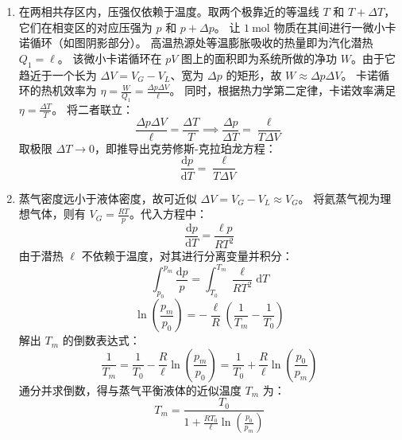 \begin{solution}
\begin{enumerate}
    \item[(a)] 在两相共存区内，压强仅依赖于温度。取两个极靠近的等温线 $T$ 和 $T + \Delta T$，它们在相变区的对应压强为 $p$ 和 $p + \Delta p$。
    让 $1 \ \mathrm{mol}$ 物质在其间进行一微小卡诺循环（如图阴影部分）。
    高温热源处等温膨胀吸收的热量即为汽化潜热 $Q_1 = \ell$。
    该微小卡诺循环在 $pV$ 图上的面积即为系统所做的净功 $W$。由于它趋近于一个长为 $\Delta V = V_G - V_L$、宽为 $\Delta p$ 的矩形，故 $W \approx \Delta p \Delta V$。
    卡诺循环的热机效率为 $\eta = \frac{W}{Q_1} = \frac{\Delta p \Delta V}{\ell}$。
    同时，根据热力学第二定律，卡诺效率满足 $\eta = \frac{\Delta T}{T}$。
    将二者联立：
    $$ \frac{\Delta p \Delta V}{\ell} = \frac{\Delta T}{T} \implies \frac{\Delta p}{\Delta T} = \frac{\ell}{T \Delta V} $$
    取极限 $\Delta T \to 0$，即推导出克劳修斯-克拉珀龙方程：
    $$ \frac{\mathrm{d}p}{\mathrm{d}T} = \frac{\ell}{T\Delta V} $$

    \item[(b)] 蒸气密度远小于液体密度，故可近似 $\Delta V = V_G - V_L \approx V_G$。
    将氦蒸气视为理想气体，则有 $V_G = \frac{RT}{p}$。代入方程中：
    $$ \frac{\mathrm{d}p}{\mathrm{d}T} = \frac{\ell p}{RT^2} $$
    由于潜热 $\ell$ 不依赖于温度，对其进行分离变量并积分：
    $$ \int_{p_0}^{p_m} \frac{\mathrm{d}p}{p} = \int_{T_0}^{T_m} \frac{\ell}{RT^2} \mathrm{d}T $$
    $$ \ln\left( \frac{p_m}{p_0} \right) = -\frac{\ell}{R} \left( \frac{1}{T_m} - \frac{1}{T_0} \right) $$
    解出 $T_m$ 的倒数表达式：
    $$ \frac{1}{T_m} = \frac{1}{T_0} - \frac{R}{\ell} \ln\left( \frac{p_m}{p_0} \right) = \frac{1}{T_0} + \frac{R}{\ell} \ln\left( \frac{p_0}{p_m} \right) $$
    通分并求倒数，得与蒸气平衡液体的近似温度 $T_m$ 为：
    $$ T_m = \frac{T_0}{1 + \frac{RT_0}{\ell} \ln \left( \frac{p_0}{p_m} \right)} $$
\end{enumerate}
\end{solution}

